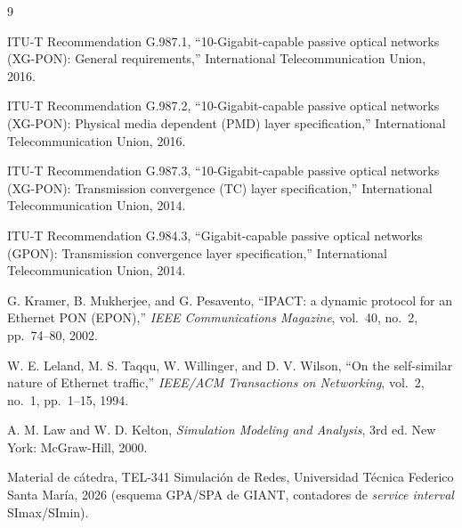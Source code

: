 \documentclass[conference]{IEEEtran}
\begin{document}
\begin{thebibliography}{9}

ITU-T Recommendation G.987.1, ``10-Gigabit-capable passive optical
networks (XG-PON): General requirements,'' International
Telecommunication Union, 2016.

ITU-T Recommendation G.987.2, ``10-Gigabit-capable passive optical
networks (XG-PON): Physical media dependent (PMD) layer specification,''
International Telecommunication Union, 2016.

ITU-T Recommendation G.987.3, ``10-Gigabit-capable passive optical
networks (XG-PON): Transmission convergence (TC) layer specification,''
International Telecommunication Union, 2014.

ITU-T Recommendation G.984.3, ``Gigabit-capable passive optical networks
(GPON): Transmission convergence layer specification,'' International
Telecommunication Union, 2014.

G. Kramer, B. Mukherjee, and G. Pesavento, ``IPACT: a dynamic protocol
for an Ethernet PON (EPON),'' \emph{IEEE Communications Magazine},
vol.~40, no.~2, pp.~74--80, 2002.

W. E. Leland, M. S. Taqqu, W. Willinger, and D. V. Wilson, ``On the
self-similar nature of Ethernet traffic,'' \emph{IEEE/ACM Transactions
on Networking}, vol.~2, no.~1, pp.~1--15, 1994.

A. M. Law and W. D. Kelton, \emph{Simulation Modeling and Analysis},
3rd ed. New York: McGraw-Hill, 2000.

Material de cátedra, TEL-341 Simulación de Redes, Universidad Técnica
Federico Santa María, 2026 (esquema GPA/SPA de GIANT, contadores de
\emph{service interval} SImax/SImin).

\end{thebibliography}
\end{document}
